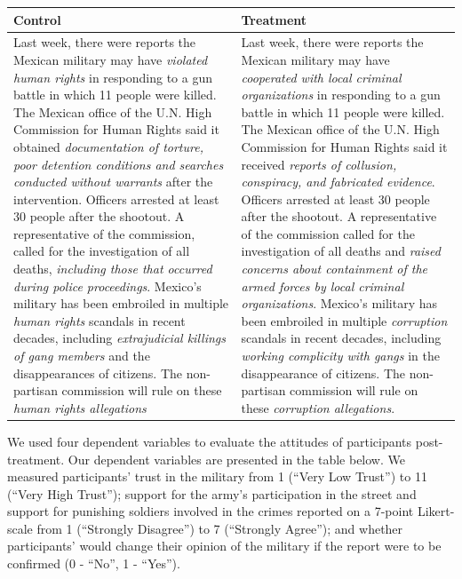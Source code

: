 \documentclass[
  12pt,
]{article}
\begin{document}
\begin{longtable}[]{@{}ll@{}}
\toprule
\begin{minipage}[b]{0.47\columnwidth}\raggedright
Control\strut
\end{minipage} & \begin{minipage}[b]{0.47\columnwidth}\raggedright
Treatment\strut
\end{minipage}\tabularnewline
\midrule
\endhead
\begin{minipage}[t]{0.47\columnwidth}\raggedright
Last week, there were reports the Mexican military may have
\emph{violated human rights} in responding to a gun battle in which 11
people were killed. The Mexican office of the U.N. High Commission for
Human Rights said it obtained \emph{documentation of torture, poor
detention conditions and searches conducted without warrants} after the
intervention. Officers arrested at least 30 people after the shootout. A
representative of the commission, called for the investigation of all
deaths, \emph{including those that occurred during police proceedings}.
Mexico's military has been embroiled in multiple \emph{human rights}
scandals in recent decades, including \emph{extrajudicial killings of
gang members} and the disappearances of citizens. The non-partisan
commission will rule on these \emph{human rights allegations}\strut
\end{minipage} & \begin{minipage}[t]{0.47\columnwidth}\raggedright
Last week, there were reports the Mexican military may have
\emph{cooperated with local criminal organizations} in responding to a
gun battle in which 11 people were killed. The Mexican office of the
U.N. High Commission for Human Rights said it received \emph{reports of
collusion, conspiracy, and fabricated evidence}. Officers arrested at
least 30 people after the shootout. A representative of the commission
called for the investigation of all deaths and \emph{raised concerns
about containment of the armed forces by local criminal organizations}.
Mexico's military has been embroiled in multiple \emph{corruption}
scandals in recent decades, including \emph{working complicity with
gangs} in the disappearance of citizens. The non-partisan commission
will rule on these \emph{corruption allegations}.\strut
\end{minipage}\tabularnewline
\bottomrule
\end{longtable}

We used four dependent variables to evaluate the attitudes of
participants post-treatment. Our dependent variables are presented in
the table below. We measured participants' trust in the military from 1
(``Very Low Trust'') to 11 (``Very High Trust''); support for the army's
participation in the street and support for punishing soldiers involved
in the crimes reported on a 7-point Likert-scale from 1 (``Strongly
Disagree'') to 7 (``Strongly Agree''); and whether participants' would
change their opinion of the military if the report were to be confirmed
(0 - ``No'', 1 - ``Yes'').
\end{document}
